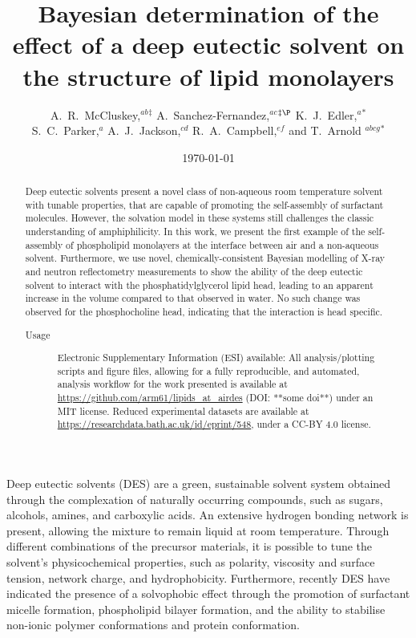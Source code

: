 \documentclass[twocolumn,a4paper]{paper}
\title{Bayesian determination of the effect of a deep eutectic solvent on the structure of lipid monolayers}
\author{A.~R.~McCluskey,\textit{$^{ab}$}$^{\ddag}$ A.~Sanchez-Fernandez,\textit{$^{ac}$}$^{\ddag\P}$ K.~J.~Edler,\textit{$^{a}$}$^{\ast}$ \\
S.~C.~Parker,\textit{$^{a}$} A.~J.~Jackson,\textit{$^{cd}$} R.~A.~Campbell,\textit{$^{ef}$} and T.~Arnold \textit{$^{abcg}$}$^{\ast}$}
\date{\today}
\begin{document}
\maketitle

\begin{abstract}
  Deep eutectic solvents present a novel class of non-aqueous room temperature solvent with tunable properties, that are capable of promoting the self-assembly of surfactant molecules. However, the solvation model in these systems still challenges the classic understanding of amphiphilicity. In this work, we present the first example of the self-assembly of phospholipid monolayers at the interface between air and a non-aqueous solvent. Furthermore, we use novel, chemically-consistent Bayesian modelling of X-ray and neutron reflectometry measurements to show the ability of the deep eutectic solvent to interact with the phosphatidylglycerol lipid head, leading to an apparent increase in the volume compared to that observed in water. No such change was observed for the phosphocholine head, indicating that the interaction is head specific.
\begin{description}
\item[Usage]
Electronic Supplementary Information (ESI) available: All analysis/plotting scripts and figure files, allowing for a fully reproducible, and automated, analysis workflow for the work presented is available at \url{https://github.com/arm61/lipids_at_airdes} (DOI: **some doi**) under an MIT license. Reduced experimental datasets are available at \url{https://researchdata.bath.ac.uk/id/eprint/548}, under a CC-BY 4.0 license.
\end{description}
\end{abstract}


Deep eutectic solvents (DES) are a green, sustainable solvent system obtained through the complexation of naturally occurring compounds, such as sugars, alcohols, amines, and carboxylic acids\cite{Smith2014,Dai2013}.
An extensive hydrogen bonding network is present, allowing the mixture to remain liquid at room temperature\cite{Hammond2016,Hammond2017,Araujo2017}.
Through different combinations of the precursor materials, it is possible to tune the solvent's physicochemical properties, such as polarity\cite{Pandey2014}, viscosity and surface tension\cite{Smith2014}, network charge\cite{Zahn2016}, and hydrophobicity\cite{Ribeiro2015,vanOsch2015}.
Furthermore, recently DES have indicated the presence of a solvophobic effect through the promotion of surfactant micelle formation\cite{Sanchez-Fernandez2016,Arnold2015}, phospholipid bilayer formation\cite{Bryant2017,Bryant2016,Gutierrez2009}, and the ability to stabilise non-ionic polymer conformations\cite{Sapir2016} and protein conformation\cite{Sanchez-Fernandez2017}.
\end{document}
